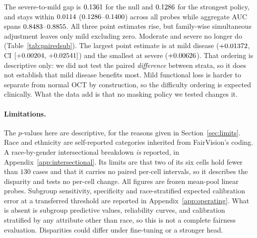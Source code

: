 \documentclass{article}
\newcommand{\ArmBest}{\textsc{centroid}}
\begin{document}
The severe-to-mild gap is $0.1361$ for the null and $0.1286$ for
the strongest policy, and stays within $0.0114$
($0.1286$--$0.1400$) across all \NprobesSub{} probes
while aggregate AUC spans $0.8483$--$0.8855$. All three point estimates
rise, but family-wise simultaneous adjustment leaves only mild excluding zero.
Moderate and severe no longer do (Table~\ref{tab:pairedsub}). The largest point estimate is at mild
disease ($+0.01372$, CI
$[+0.00204,\,+0.02541]$) and the smallest at severe ($+0.00626$). That ordering
is descriptive only: we did not test the paired \emph{difference} between
strata, so it does not establish that mild disease benefits most. Mild
functional loss is harder to separate from normal OCT by construction, so
the difficulty ordering is expected clinically. What the data add is that no
masking policy we tested changes it.

\begin{table}[h]
\centering
\caption{Paired change in subgroup AUC from \textsc{random} to
\ArmBest{} at matched epoch 100. The eight rows plus two gain-difference
contrasts in the text form one exploratory family. Reported CIs are 95\%
single-step max-$|t|$ simultaneous intervals from \Nboot{} outcome-stratified
paired subject resamples shared across both fixed heads and every stratum
(family-wise $\alpha=0.05$). Four of ten exclude zero: mild severity, white
race, and both gender strata.}
\label{tab:pairedsub}
\small

\end{table}

\paragraph{Limitations.} The $p$-values here are descriptive, for the reasons
given in Section~\ref{sec:limits}. Race and ethnicity are
self-reported categories inherited from FairVision's coding. A race-by-gender
intersectional breakdown \emph{is} reported, in
Appendix~\ref{app:intersectional}. Its limits are that two of its six cells hold
fewer than $130$ cases and that it carries no paired per-cell intervals, so it
describes the disparity and tests no per-cell change.
All figures are frozen mean-pool
linear probes. Subgroup sensitivity, specificity and race-stratified expected
calibration error at a transferred threshold are reported in
Appendix~\ref{app:operating}. What is absent is subgroup predictive values,
reliability curves, and calibration stratified by any attribute other than race,
so this is not a complete fairness
evaluation. Disparities
could differ under fine-tuning or a stronger head.
\end{document}
